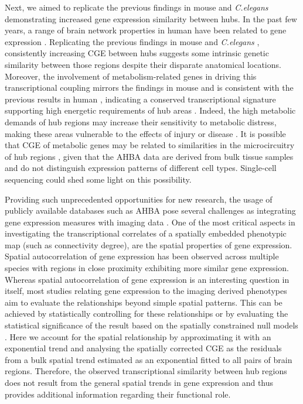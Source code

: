 Next, we aimed to replicate the previous findings in mouse \citep{Fulcher2016} and \textit{C.elegans} \citep{Arnatkeviciute2018} demonstrating increased gene expression similarity between hubs. In the past few years, a range of brain network properties in human have been related to gene expression \citep{Cioli2014b,Forest2017,Goel2014,Richiardi2015,Vertes2016b}. Replicating the previous findings in mouse \citep{Fulcher2016} and \textit{C.elegans} \citep{Arnatkeviciute2018}, consistently increasing CGE between hubs suggests some intrinsic genetic similarity between those regions despite their disparate anatomical locations. Moreover, the involvement of metabolism-related genes in driving this transcriptional coupling mirrors the findings in mouse \citep{Fulcher2016} and is consistent with the previous results in human \citep{Vertes2016b}, indicating a conserved transcriptional signature supporting high energetic requirements of hub areas \citep{Liang2013a,Tomasi2013,Vaishnavi2010,Varkuti2011}. Indeed, the high metabolic demands of hub regions may increase their sensitivity to metabolic distress, making these areas vulnerable to the effects of injury or disease \citep{Crossley2014,Fornito2015}. It is possible that CGE of metabolic genes may be related to similarities in the microcircuitry of hub regions \citep{Scholtens2014}, given that the AHBA data are derived from bulk tissue samples and do not distinguish expression patterns of different cell types. Single-cell sequencing \citep{Lein2017} could shed some light on this possibility.

Providing such unprecedented opportunities for new research, the usage of publicly available databases such as AHBA pose several challenges as integrating gene expression measures with imaging data \citep{Arnatkeviciute2019,Fornito2019}. One of the most critical aspects in investigating the transcriptional correlates of a spatially embedded phenotypic map (such as connectivity degree), are the spatial properties of gene expression. Spatial autocorrelation of gene expression has been observed across multiple species \citep{Arnatkeviciute2018,Burt2018,Fornito2019,Fulcher2016,Fulcher2019} with regions in close proximity exhibiting more similar gene expression. Whereas spatial autocorrelation of gene expression is an interesting question in itself, most studies relating gene expression to the imaging derived phenotypes aim to evaluate the relationships beyond simple spatial patterns. This can be achieved by statistically controlling for these relationships \citep{Fulcher2016} or by evaluating the statistical significance of the result based on the spatially constrained null models \citep{Burt2018,Romero-Garcia2018,Whitaker2016a,Vasa2018,Vertes2016b}. Here we account for the spatial relationship by approximating it with an exponential trend and analysing the spatially corrected CGE as the residuals from a bulk spatial trend estimated as an exponential fitted to all pairs of brain regions. Therefore, the observed transcriptional similarity between hub regions does not result from the general spatial trends in gene expression and thus provides additional information regarding their functional role.

